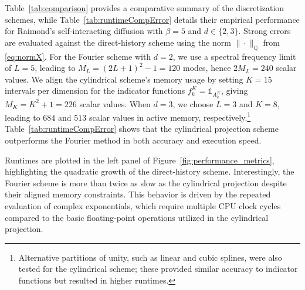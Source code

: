 \documentclass[11pt]{article}
\numberwithin{equation}{section}
\theoremstyle{plain}
\theoremstyle{definition}
\DeclareMathOperator{\Q}{\mathbb{Q}}
\begin{document}
Table~\ref{tab:comparison} provides a comparative summary of the discretization schemes, while Table~\ref{tab:runtimeCompError} details their empirical performance for Raimond's self-interacting diffusion with $\beta = 5$ and $d\in \{2,3\}$. Strong errors are evaluated against the direct-history scheme using the norm $\|\cdot\|_{\Q}$ from  \eqref{eq:normX}.  For the Fourier scheme with $d= 2$, we use a spectral frequency limit of  $L = 5$, leading to $M_L = (2L + 1)^2 - 1 =  120$ modes, hence $2M_L = 240$  scalar values. %
We align the cylindrical scheme's memory usage by setting $K = 15$ intervals per dimension for the indicator functions $f_k^K = \mathds{1}_{A_k^K}$, giving $M_K = K^2 + 1 = 226$ scalar values. When $d = 3$, we choose $L = 3$ and $K = 8$, leading to $684$ and $513$ scalar values in active memory, respectively.\footnote{Alternative partitions of unity, such as linear and cubic splines, were also tested for the cylindrical scheme; these provided similar accuracy to indicator functions but resulted in higher runtimes.} 
 Table~\ref{tab:runtimeCompError} shows that the cylindrical projection scheme outperforms the Fourier method in both accuracy and execution speed. 

Runtimes are plotted in the left panel of Figure~\ref{fig:performance_metrics}, highlighting the quadratic growth of the direct-history scheme.  Interestingly, the Fourier scheme is more than twice as slow as the cylindrical projection despite their aligned memory constraints. This behavior is driven by the repeated evaluation of complex exponentials, which require multiple CPU clock cycles compared to the basic floating-point operations utilized in the cylindrical projection. 
\end{document}
